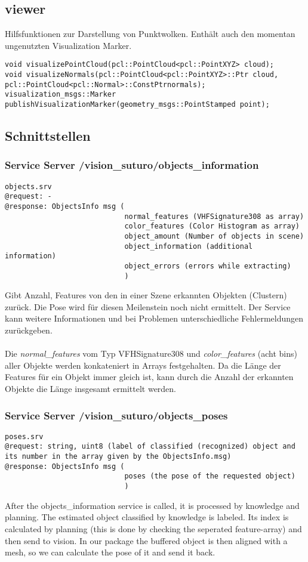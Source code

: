 \documentclass{suturo}
\begin{document}
\subsection*{viewer}
Hilfsfunktionen zur Darstellung von Punktwolken.
Enthält auch den momentan ungenutzten Visualization Marker.

\begin{verbatim}
void visualizePointCloud(pcl::PointCloud<pcl::PointXYZ> cloud);
void visualizeNormals(pcl::PointCloud<pcl::PointXYZ>::Ptr cloud, pcl::PointCloud<pcl::Normal>::ConstPtrnormals);
visualization_msgs::Marker publishVisualizationMarker(geometry_msgs::PointStamped point);
\end{verbatim}


\subsection{Schnittstellen}

\subsubsection{Service Server /vision\_suturo/objects\_information}
\begin{verbatim}
objects.srv
@request: -
@response: ObjectsInfo msg (
							normal_features (VHFSignature308 as array)
							color_features (Color Histogram as array)
							object_amount (Number of objects in scene)
							object_information (additional information)
							object_errors (errors while extracting)
							)
\end{verbatim}
Gibt Anzahl, Features von den in einer Szene erkannten Objekten (Clustern) zurück. Die Pose wird für diesen Meilenstein noch nicht ermittelt. Der Service kann weitere Informationen und bei Problemen unterschiedliche Fehlermeldungen zurückgeben.
\\ \\
Die \textit{normal\_features} vom Typ VFHSignature308 und \textit{color\_features} (acht bins) aller Objekte werden konkateniert in Arrays festgehalten. 
Da die Länge der Features für ein Objekt immer gleich ist, kann durch die Anzahl der erkannten Objekte die Länge insgesamt ermittelt werden.

\subsubsection{Service Server /vision\_suturo/objects\_poses}
\begin{verbatim}
poses.srv
@request: string, uint8 (label of classified (recognized) object and its number in the array given by the ObjectsInfo.msg)
@response: ObjectsInfo msg (
							poses (the pose of the requested object)
							)
\end{verbatim}
After the objects\_information service is called, it is processed by knowledge and planning. The estimated object classified by knowledge is labeled. Its index is calculated by planning (this is done by checking the seperated feature-array) and then send to vision. In our package the buffered object is then aligned with a mesh, so we can calculate the pose of it and send it back.
\end{document}
